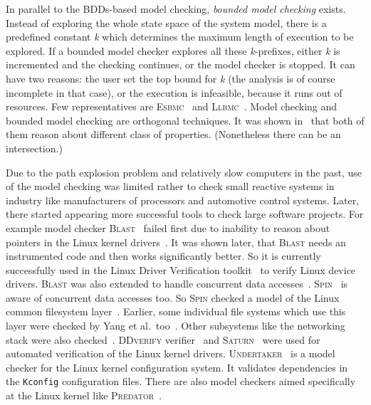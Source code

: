 In parallel to the BDDs-based model checking, \emph{bounded model checking}
exists. Instead of exploring the whole state space of the system model, there
is a predefined constant \textit{k} which determines the maximum length of
execution to be explored. If a bounded model checker explores all these
\textit{k}-prefixes, either \textit{k} is incremented and the checking
continues, or the model checker is stopped. It can have two reasons: the user
set the top bound for \textit{k} (the analysis is of course incomplete in that
case), or the execution is infeasible, because it runs out of resources. Few
representatives are \textsc{Esbmc}~\cite{esbmc} and
\textsc{Llbmc}~\cite{llbmc}. Model checking and bounded model checking are
orthogonal techniques. It was shown in~\cite{bmc_survey} that both of them
reason about different class of properties. (Nonetheless there can be an
intersection.)

Due to the path explosion problem and relatively slow computers in the past,
use of the model checking was limited rather to check small reactive systems
in industry like manufacturers of processors and automotive control systems.
Later, there started appearing more successful tools to check large software
projects. For example model checker \textsc{Blast}~\cite{blast} failed first
due to inability to reason about pointers in the Linux kernel
drivers~\cite{blast_kernel}. It was shown later, that \textsc{Blast} needs an
instrumented code and then works significantly better.  So it is currently
successfully used in the Linux Driver Verification toolkit~\cite{ldv} to
verify Linux device drivers. \textsc{Blast} was also extended to handle
concurrent data accesses~\cite{blast_concur}.  \textsc{Spin}~\cite{spin} is
aware of concurrent data accesses too. So \textsc{Spin} checked a model of the
Linux common filesystem layer~\cite{spin_vfs}. Earlier, some individual file
systems which use this layer were checked by Yang et al.\
too~\cite{mc_kernel_fs}. Other subsystems like the networking stack were
also checked~\cite{mc_kernel_ip}.  \textsc{DDverify} verifier~\cite{ddverify}
and \textsc{Saturn}~\cite{saturn} were used for automated verification of the
Linux kernel drivers.  \textsc{Undertaker}~\cite{undertaker} is a model
checker for the Linux kernel configuration system. It validates dependencies
in the \texttt{Kconfig} configuration files.  There are also model checkers
aimed specifically at the Linux kernel like \textsc{Predator}~\cite{predator}.

